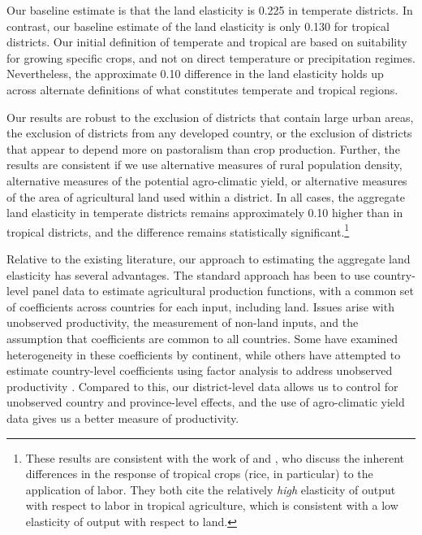 \documentclass[11pt]{article}
\begin{document}
Our baseline estimate is that the land elasticity is 0.225 in temperate districts. In contrast, our baseline estimate of the land elasticity is only 0.130 for tropical districts. Our initial definition of temperate and tropical are based on suitability for growing specific crops, and not on direct temperature or precipitation regimes. Nevertheless, the approximate 0.10 difference in the land elasticity holds up across alternate definitions of what constitutes temperate and tropical regions. 

Our results are robust to the exclusion of districts that contain large urban areas, the exclusion of districts from any developed country, or the exclusion of districts that appear to depend more on pastoralism than crop production. Further, the results are consistent if we use alternative measures of rural population density, alternative measures of the potential agro-climatic yield, or alternative measures of the area of agricultural land used within a district. In all cases, the aggregate land elasticity in temperate districts remains approximately 0.10 higher than in tropical districts, and the difference remains statistically significant.\footnote{These results are consistent with the work of \citet{Ruthenberg:1976zr} and \citet{bray1994}, who discuss the inherent differences in the response of tropical crops (rice, in particular) to the application of labor. They both cite the relatively \textit{high} elasticity of output with respect to labor in tropical agriculture, which is consistent with a low elasticity of output with respect to land.} 

Relative to the existing literature, our approach to estimating the aggregate land elasticity has several advantages. The standard approach has been to use country-level panel data \citep{Hayami:1970ly,Hayami:1985cr,cpr1997,mm2001,Mundlak:2000dq,mbl2012,et2013mango} to estimate agricultural production functions, with a common set of coefficients across countries for each input, including land. Issues arise with unobserved productivity, the measurement of non-land inputs, and the assumption that coefficients are common to all countries. Some have examined heterogeneity in these coefficients \citep{gg2003,Wiebe2003Resource-Qualit} by continent, while others have attempted to estimate country-level coefficients using factor analysis to address unobserved productivity \citep{et2013mango,ev2016clim}. Compared to this, our district-level data allows us to control for unobserved country and province-level effects, and the use of agro-climatic yield data gives us a better measure of productivity. 
\end{document}
